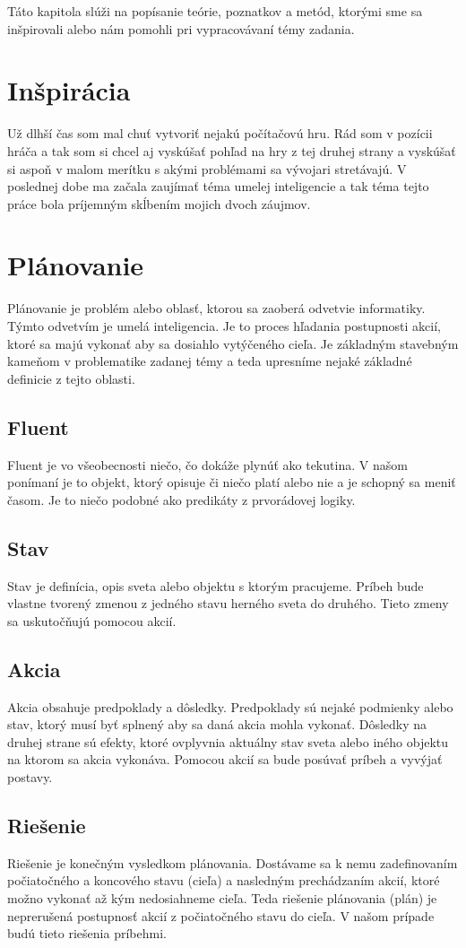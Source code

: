 Táto kapitola slúži na popísanie teórie, poznatkov a metód, ktorými sme sa inšpirovali alebo nám pomohli pri vypracovávaní témy zadania.

\section{Inšpirácia}
Už dlhší čas som mal chuť vytvoriť nejakú počítačovú hru. Rád som v pozícii hráča a tak som si chcel aj vyskúšať pohľad na hry z tej druhej strany a vyskúšať si aspoň v malom merítku s akými problémami sa vývojari stretávajú. V poslednej dobe ma začala zaujímať téma umelej inteligencie a tak téma tejto práce bola príjemným skĺbením mojich dvoch záujmov.
\section{Plánovanie}
Plánovanie je problém alebo oblasť, ktorou sa zaoberá odvetvie informatiky. Týmto odvetvím je umelá inteligencia. Je to proces hľadania postupnosti akcií, ktoré sa majú vykonať aby sa dosiahlo vytýčeného cieľa. Je základným stavebným kameňom v problematike zadanej témy a teda upresníme nejaké základné definicie z tejto oblasti.
\subsection{Fluent}
Fluent je vo všeobecnosti niečo, čo dokáže plynúť ako tekutina\cite{approach}. V našom ponímaní je to objekt, ktorý opisuje či niečo platí alebo nie a je schopný sa meniť časom. Je to niečo podobné ako predikáty z prvorádovej logiky.
\subsection{Stav}
Stav je definícia, opis sveta alebo objektu s ktorým pracujeme. Príbeh bude vlastne tvorený zmenou z jedného stavu herného sveta do druhého. Tieto zmeny sa uskutočňujú pomocou akcií.
\subsection{Akcia}
Akcia obsahuje predpoklady a dôsledky. Predpoklady sú nejaké podmienky alebo stav, ktorý musí byť splnený aby sa daná akcia mohla vykonať. Dôsledky na druhej strane sú efekty, ktoré ovplyvnia aktuálny stav sveta alebo iného objektu na ktorom sa akcia vykonáva. Pomocou akcií sa bude posúvať príbeh a vyvýjať postavy.
\subsection{Riešenie}
Riešenie je konečným vysledkom plánovania. Dostávame sa k nemu zadefinovaním počiatočného a koncového stavu (cieľa) a nasledným prechádzaním akcií, ktoré možno vykonať až kým nedosiahneme cieľa. Teda riešenie plánovania (plán) je neprerušená postupnosť akcií z počiatočného stavu do cieľa. V našom prípade budú tieto riešenia príbehmi.\par
